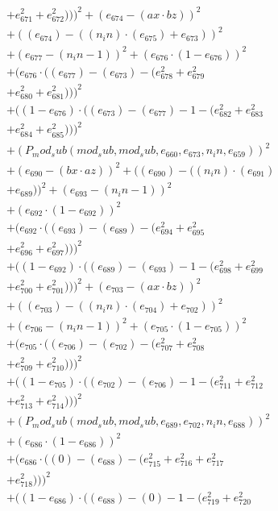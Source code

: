 \documentclass[10pt, a4paper]{article}
\begin{document}
\begin{small}
\begin{align*}
& + e_{671}^{2} + e_{672}^{2})))^{2} + (e_{674} - (ax  \cdot  bz))^{2} \\
& + ((e_{674}) - ((n_in)  \cdot  (e_{675}) + e_{673}))^{2} \\
& + (e_{677} - (n_in - 1))^{2} + (e_{676}  \cdot  (1 - e_{676}))^{2} \\
& + (e_{676}  \cdot  ((e_{677}) - (e_{673}) - (e_{678}^{2} + e_{679}^{2} \\
& + e_{680}^{2} + e_{681}^{2})))^{2} \\
& + ((1 - e_{676})  \cdot  ((e_{673}) - (e_{677}) - 1 - (e_{682}^{2} + e_{683}^{2} \\
& + e_{684}^{2} + e_{685}^{2})))^{2} \\
& + (P_mod_sub(mod_sub, mod_sub, e_{660}, e_{673}, n_in, e_{659}))^{2} \\
& + (e_{690} - (bx  \cdot  az))^{2} + ((e_{690}) - ((n_in)  \cdot  (e_{691}) \\
& + e_{689}))^{2} + (e_{693} - (n_in - 1))^{2} \\
& + (e_{692}  \cdot  (1 - e_{692}))^{2} \\
& + (e_{692}  \cdot  ((e_{693}) - (e_{689}) - (e_{694}^{2} + e_{695}^{2} \\
& + e_{696}^{2} + e_{697}^{2})))^{2} \\
& + ((1 - e_{692})  \cdot  ((e_{689}) - (e_{693}) - 1 - (e_{698}^{2} + e_{699}^{2} \\
& + e_{700}^{2} + e_{701}^{2})))^{2} + (e_{703} - (ax  \cdot  bz))^{2} \\
& + ((e_{703}) - ((n_in)  \cdot  (e_{704}) + e_{702}))^{2} \\
& + (e_{706} - (n_in - 1))^{2} + (e_{705}  \cdot  (1 - e_{705}))^{2} \\
& + (e_{705}  \cdot  ((e_{706}) - (e_{702}) - (e_{707}^{2} + e_{708}^{2} \\
& + e_{709}^{2} + e_{710}^{2})))^{2} \\
& + ((1 - e_{705})  \cdot  ((e_{702}) - (e_{706}) - 1 - (e_{711}^{2} + e_{712}^{2} \\
& + e_{713}^{2} + e_{714}^{2})))^{2} \\
& + (P_mod_sub(mod_sub, mod_sub, e_{689}, e_{702}, n_in, e_{688}))^{2} \\
& + (e_{686}  \cdot  (1 - e_{686}))^{2} \\
& + (e_{686}  \cdot  ((0) - (e_{688}) - (e_{715}^{2} + e_{716}^{2} + e_{717}^{2} \\
& + e_{718}^{2})))^{2} \\
& + ((1 - e_{686})  \cdot  ((e_{688}) - (0) - 1 - (e_{719}^{2} + e_{720}^{2} \\

\end{align*}
\end{small}
\end{document}
